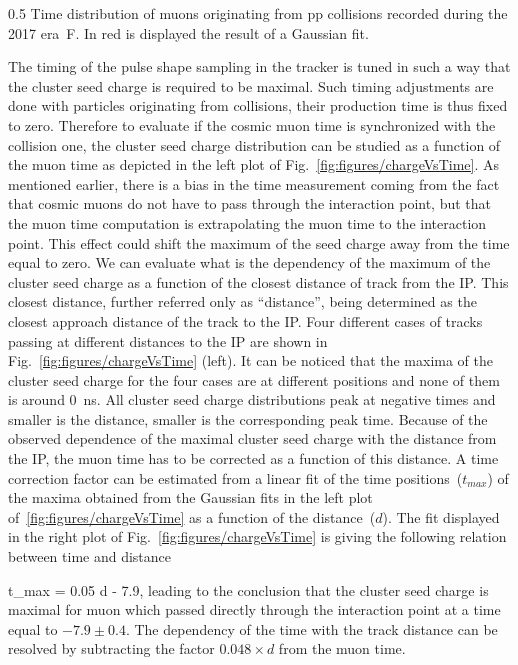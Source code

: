                  {0.5}       %
                 { Time distribution of muons originating from pp collisions recorded during the 2017 era~F. In red is displayed the result of a Gaussian fit.  }


The timing of the pulse shape sampling in the tracker is tuned in such a way that the cluster seed charge is required to be maximal. Such timing adjustments are done with particles originating from collisions, their production time is thus fixed to zero. Therefore to evaluate if the cosmic muon time is synchronized with the collision one, the cluster seed charge distribution can be studied as a function of the muon time as depicted in the left plot of Fig.~\ref{fig:figures/chargeVsTime}. As mentioned earlier, there is a bias in the time measurement coming from the fact that cosmic muons do not have to pass through the interaction point, but that the muon time computation is extrapolating the muon time to the interaction point. This effect could shift the maximum of the seed charge away from the time equal to zero. We can evaluate what is the dependency of the maximum of the cluster seed charge as a function of the closest distance of track from the IP. This closest distance, further referred only as ``distance'', being determined as the closest approach distance of the track to the IP. Four different cases of tracks passing at different distances to the IP are shown in Fig.~\ref{fig:figures/chargeVsTime} (left).  It can be noticed that the maxima of the cluster seed charge for the four cases are at different positions and none of them is around 0~ns. All cluster seed charge distributions peak at negative times and smaller is the distance, smaller is the corresponding peak time. Because of the observed dependence of the maximal cluster seed charge with the distance from the IP, the muon time has to be corrected as a function of this distance. A time correction factor can be estimated from a linear fit of the time positions~($t_{max}$) of the maxima obtained from the Gaussian fits in the left plot of~\ref{fig:figures/chargeVsTime} as a function of the distance~($d$). The fit displayed in the right plot of Fig.~\ref{fig:figures/chargeVsTime} is giving the following relation between time and distance

{
t_{max} = 0.05  \times d  - 7.9,
}
leading to the conclusion that the cluster seed charge is maximal for muon which passed directly through the interaction point at a time equal to $-7.9 \pm 0.4 $. The dependency of the time with the track distance can be resolved by subtracting the factor $ 0.048 \times d $ from the muon time.


